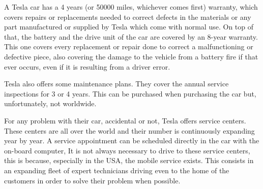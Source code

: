 A Tesla car has a 4 years (or 50000 miles, whichever comes first) warranty, which covers repairs or replacements needed to correct defects in the materials or any part manufactured or supplied by Tesla which come with normal use. On top of that, the battery and the drive unit of the car are covered by an 8-year warranty. This one covers every replacement or repair done to correct a malfunctioning or defective piece, also covering the damage to the vehicle from a battery fire if that ever occurs, even if it is resulting from a driver error\cite{teslaWarranty}. 

Tesla also offers some maintenance plans. They cover the annual service inspections for 3 or 4 years. This can be purchased when purchasing the car but, unfortunately, not worldwide. 

For any problem with their car, accidental or not, Tesla offers service centers. These centers are all over the world and their number is continuously expanding year by year. A service appointment can be scheduled directly in the car with the on-board computer, It is not always necessary to drive to these service centers, this is because, especially in the USA, the mobile service exists. This consists in an expanding fleet of expert technicians driving even to the home of the customers in order to solve their problem when possible.



